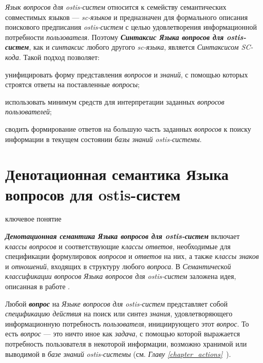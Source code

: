 \textit{Язык вопросов для ostis-систем} относится к семейству семантических совместимых языков --- \textit{sc-языков} и предназначен для формального описания поискового предписания \textit{ostis-систем} с целью удовлетворения информационной потребности \textit{пользователя}. Поэтому \textbf{\textit{Синтаксис Языка вопросов для ostis-систем}}, как и \textit{синтаксис} любого другого \textit{sc-языка}, является \textit{Синтаксисом SC-кода}. Такой подход позволяет:
\begin{textitemize}
	\item унифицировать форму представления \textit{вопросов} и \textit{знаний}, с помощью которых строятся ответы на поставленные \textit{вопросы};
	\item использовать минимум средств для интерпретации заданных \textit{вопросов пользователей};
	\item сводить формирование ответов на большую часть заданных \textit{вопросов} к поиску информации в текущем состоянии \textit{базы знаний ostis-системы}.
\end{textitemize}

\section{Денотационная семантика Языка вопросов для ostis-систем}
\label{sec_requests_den_semantics}

\begin{SCn}
\begin{scnrelfromlist}{ключевое понятие}
\end{scnrelfromlist}
\end{SCn}

\textbf{\textit{Денотационная семантика Языка вопросов для ostis-систем}} включает \textit{классы вопросов} и соответствующие \textit{классы ответов}, необходимые для спецификации формулировок \textit{вопросов} и \textit{ответов} на них, а также \textit{классы знаков} и \textit{отношений}, входящих в структуру любого \textit{вопроса}. В \textit{Семантической классификации вопросов} \textit{Языка вопросов для ostis-систем} заложена идея, описанная в работе .

Любой \textbf{\textit{вопрос}} на \textit{Языке вопросов для ostis-систем} представляет собой \textit{спецификацию действия} на поиск или синтез \textit{знания}, удовлетворяющего информационную потребность \textit{пользователя}, инициирующего этот \textit{вопрос}. То есть \textit{вопрос} --- это ничто иное как \textit{задача}, с помощью которой выражается потребность пользователя в некоторой информации, возможно хранимой или выводимой в \textit{базе знаний} \textit{ostis-системы} (см. \textit{Главу \ref{chapter_actions}~}). 

